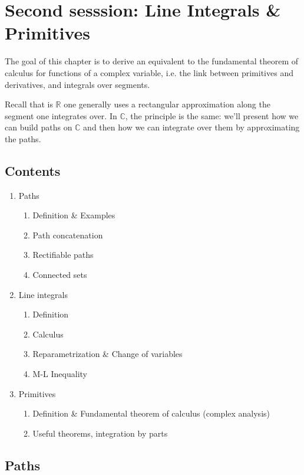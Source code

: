 \section{Second sesssion: Line Integrals \& Primitives} 
The goal of this chapter is to derive an equivalent to the fundamental theorem of calculus for functions of a complex variable, i.e. the link between primitives and derivatives, and integrals over segments.

Recall that is $\mathbb{R}$ one generally uses a rectangular approximation along the segment one integrates over. In $\mathbb{C}$, the principle is the same: we'll present how we can build paths on $\mathbb{C}$ and then how we can integrate over them by approximating the paths.

\subsection*{Contents}
\begin{enumerate}
    \item Paths
        \begin{enumerate}
            \item Definition \& Examples
            \item Path concatenation
            \item Rectifiable paths
            \item Connected sets
        \end{enumerate}
    \item Line integrals 
        \begin{enumerate}
            \item Definition
            \item Calculus
            \item Reparametrization \& Change of variables
            \item M-L Inequality
        \end{enumerate}
    \item Primitives
        \begin{enumerate}
            \item Definition \& Fundamental theorem of calculus (complex analysis)
            \item Useful theorems, integration by parts
        \end{enumerate}
        
\end{enumerate}

\subsection{Paths}
